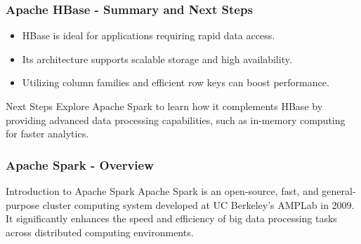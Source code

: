 \documentclass[aspectratio=169]{beamer}
\begin{document}
\begin{frame}[fragile]
    \frametitle{Apache HBase - Summary and Next Steps}
    \begin{itemize}
        \item HBase is ideal for applications requiring rapid data access.
        \item Its architecture supports scalable storage and high availability.
        \item Utilizing column families and efficient row keys can boost performance.
    \end{itemize}
    
    \begin{block}{Next Steps}
        Explore Apache Spark to learn how it complements HBase by providing advanced data processing capabilities, 
        such as in-memory computing for faster analytics.
    \end{block}
\end{frame}

\begin{frame}[fragile]
    \frametitle{Apache Spark - Overview}
    \begin{block}{Introduction to Apache Spark}
        Apache Spark is an open-source, fast, and general-purpose cluster computing system developed at UC Berkeley's AMPLab in 2009. 
        It significantly enhances the speed and efficiency of big data processing tasks across distributed computing environments.
    \end{block}
\end{frame}
\end{document}

